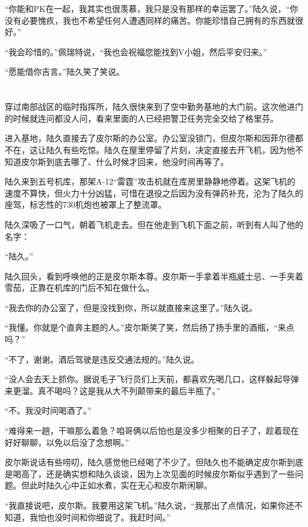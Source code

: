 “你能和PK在一起，我其实也很羡慕，我只是没有那样的幸运罢了。”陆久说，“你没有必要愧疚，我也不希望任何人遭遇同样的痛苦。你能珍惜自己拥有的东西就很好。”

“我会珍惜的。”佩瑞特说，“我也会祝福您能找到V小姐，然后平安归来。”

“愿能借你吉言。”陆久笑了笑说。

\section*{}

穿过南部战区的临时指挥所，陆久很快来到了空中勤务基地的大门前。这次他进门的时候就连问都没人问，看来里面的人已经把警卫任务完全交给了格里芬。

进入基地，陆久直接去了皮尔斯的办公室。办公室没锁门，但皮尔斯和因菲尔德都不在，这让陆久有些吃惊。陆久在屋里停留了片刻，决定直接去开飞机，因为他不知道皮尔斯到底去哪了、什么时候才回来，他没时间再等了。

陆久来到五号机库，那架A-12“雷霆”攻击机就在库房里静静地停着。这架飞机的速度不算快，但火力十分凶猛，可惜在退役之后因为没有弹药补充，沦为了陆久的座驾，标志性的730机炮也被罩上了整流罩。

陆久深吸了一口气，朝着飞机走去。但在他走到飞机下面之前，听到有人叫了他的名字：

“陆久。”

陆久回头，看到呼唤他的正是皮尔斯本尊。皮尔斯一手拿着半瓶威士忌、一手夹着雪茄，正靠在机库的门后不知在做什么。

“我去你的办公室了，但是没找到你，所以就直接来这里了。”陆久说。

“我懂。你就是个直奔主题的人。”皮尔斯笑了笑，然后扬了扬手里的酒瓶，“来点吗？”

“不了，谢谢。酒后驾驶是违反交通法规的。”陆久说。

“没人会去天上抓你。据说毛子飞行员们上天前，都喜欢先喝几口，这样躲起导弹来更溜。真不喝吗？这是我从大不列颠带来的最后半瓶了。”

“不。我没时间喝酒了。”

“难得来一趟，干嘛那么着急？咱哥俩以后怕也是没多少相聚的日子了，趁着现在好好聊聊，以免以后没了念想啊。”

皮尔斯说话有些唠叨，陆久感觉他已经喝了不少了。但陆久也不能确定皮尔斯到底是喝高了，还是确实想和陆久谈谈，因为上次见面的时候皮尔斯似乎遇到了一些问题。但此时陆久心中正如水煮，实在无心和皮尔斯闲聊。

“我直接说吧，皮尔斯。我要用这架飞机。”陆久说，“我那出了点情况，如果你还不知道，我怕也没时间和你细说了。我赶时间。”

